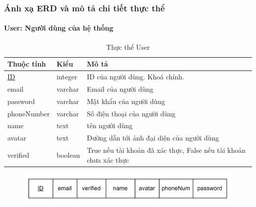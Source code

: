 \subsubsection{Ánh xạ ERD và mô tả chi tiết thực thể}
\paragraph{User: Người dùng của hệ thống}
\begin{center}
\begin{table}[!h]
        \begin{tabular}{|p{3cm} |p{2cm} |p{9cm}|}
                \hline
                   Thuộc tính & Kiểu & Mô tả \\ [0.5ex] 
                \hline
                \underline{ID} & integer & ID của người dùng. Khoá chính. \\ 
                \hline
                email & varchar & Email của người dùng \\
                \hline
                password & varchar & Mật khẩu của người dùng \\
                \hline
                phoneNumber & varchar & Số điện thoại của người dùng \\
                \hline
                name & text & tên người dùng \\ [1ex] 
                \hline
                avatar & text & Đường dẫn tới ảnh đại diện của người dùng \\
                \hline
                verified & boolean & True nếu tài khoản đã xác thực, False nếu tài khoản chưa xác thực \\
                \hline
               \end{tabular}
                 \caption{Thực thể User}
\end{table}
\end{center}
\begin{figure}[H]
        \centering
        \includegraphics[width=\textwidth]{Content//Phân tích và thiết kế hệ thống//images//ERD_mapping/user_mapping.png}
        \label{fig:Thực thể User}
\end{figure}
